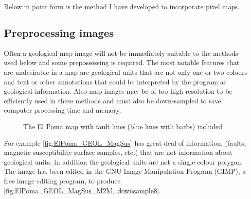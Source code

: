 Below in point form is the method I have developed to incorporate pixel maps.

\subsection{ Preprocessing images}
\label{subsec:Preprocessing images}

Often a geological map image will not be immediately suitable to the methods used below and some prepossessing is required. The most notable features that are undesirable in a map are geological units that are not only one or two colours and text or other annotations that could be interpreted by the program as geological information. Also map images may be of too high resolution to be efficiently used in these methods and must also be down-sampled to save  computer processing time and memory.

 \begin{figure} [h]
    \centering
    \caption{The El Poma map with fault lines (blue lines with barbs) included}
    \label{fig:ElPoma_GEOL_MagSus}
\end{figure}

For example \autoref{fig:ElPoma_GEOL_MagSus} has great deal of information, (faults, magnetic susceptibility surface samples, etc.) that are not information about geological units. In addition the geological units are not a single colour polygon. The image has been edited in the GNU Image Manipulation Program (GIMP), a free image editing program, to produce \autoref{fig:ElPoma_GEOL_MagSus_M2M_downsample8}. 

